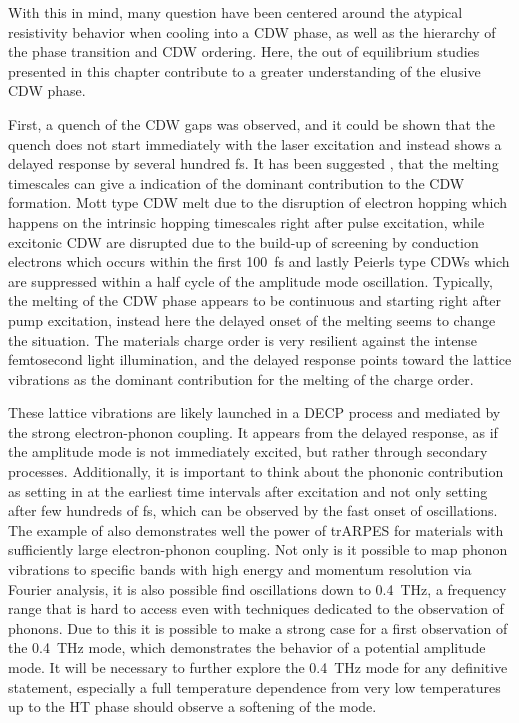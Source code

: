 With this in mind, many question have been centered around the atypical resistivity behavior when cooling into a CDW phase, as well as the hierarchy of the phase transition and CDW ordering.
Here, the out of equilibrium studies presented in this chapter contribute to a greater understanding of the elusive CDW phase. 

First, a quench of the CDW gaps was observed, and it could be shown that the quench does not start immediately with the laser excitation and instead shows a delayed response by several hundred \unit{\femto\second}.
It has been suggested \cite{hellmann_time-domain_2012}, that the melting timescales can give a indication of the dominant contribution to the CDW formation.
Mott type CDW melt due to the disruption of electron hopping which happens on the intrinsic hopping timescales right after pulse excitation, while excitonic CDW are disrupted due to the build-up of screening by conduction electrons which occurs within the first \qty{100}{\femto\second} and lastly Peierls type CDWs which are suppressed within a half cycle of the amplitude mode oscillation.
Typically, the melting of the CDW phase appears to be continuous and starting right after pump excitation, instead here the delayed onset of the melting seems to change the situation.
The materials charge order is very resilient against the intense femtosecond light illumination, and the delayed response points toward the lattice vibrations as the dominant contribution for the melting of the charge order. 

These lattice vibrations are likely launched in a DECP process and mediated by the strong electron-phonon coupling.
It appears from the delayed response, as if the amplitude mode is not immediately excited, but rather through secondary processes.
Additionally, it is important to think about the phononic contribution as setting in at the earliest time intervals after excitation and not only setting after few hundreds of \unit{\femto\second}, which can be observed by the fast onset of oscillations.
The example of  also demonstrates well the power of trARPES for materials with sufficiently large electron-phonon coupling.
Not only is it possible to map phonon vibrations to specific bands with high energy and momentum resolution via Fourier analysis, it is also possible find oscillations down to \qty{0.4}{\tera\hertz}, a frequency range that is hard to access even with techniques dedicated to the observation of phonons.
Due to this it is possible to make a strong case for a first observation of the \qty{0.4}{\tera\hertz} mode, which demonstrates the behavior of a potential amplitude mode.
It will be necessary to further explore the \qty{0.4}{\tera\hertz} mode for any definitive statement, especially a full temperature dependence from very low temperatures up to the HT phase should observe a softening of the mode.

